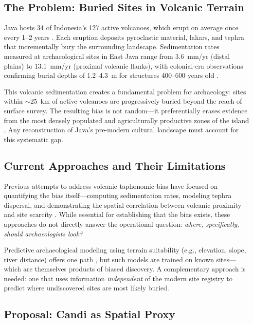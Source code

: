 \documentclass[12pt,a4paper]{article}
\begin{document}
\subsection{The Problem: Buried Sites in Volcanic Terrain}

Java hosts 34 of Indonesia's 127 active volcanoes, which erupt on average once every 1--2 years \citep{gvp2023}. Each eruption deposits pyroclastic material, lahars, and tephra that incrementally bury the surrounding landscape. Sedimentation rates measured at archaeological sites in East Java range from 3.6~mm/yr (distal plains) to 13.1~mm/yr (proximal volcanic flanks), with colonial-era observations confirming burial depths of 1.2--4.3~m for structures 400--600 years old \citep{amien2026p1}.

This volcanic sedimentation creates a fundamental problem for archaeology: sites within $\sim$25~km of active volcanoes are progressively buried beyond the reach of surface survey. The resulting bias is not random---it preferentially erases evidence from the most densely populated and agriculturally productive zones of the island \citep{mohr1938}. Any reconstruction of Java's pre-modern cultural landscape must account for this systematic gap.

\subsection{Current Approaches and Their Limitations}

Previous attempts to address volcanic taphonomic bias have focused on quantifying the bias itself---computing sedimentation rates, modeling tephra dispersal, and demonstrating the spatial correlation between volcanic proximity and site scarcity \citep{amien2026p1, amien2026p2}. While essential for establishing that the bias exists, these approaches do not directly answer the operational question: \emph{where, specifically, should archaeologists look?}

Predictive archaeological modeling using terrain suitability (e.g., elevation, slope, river distance) offers one path \citep{amien2026p2}, but such models are trained on known sites---which are themselves products of biased discovery. A complementary approach is needed: one that uses information \emph{independent} of the modern site registry to predict where undiscovered sites are most likely buried.

\subsection{Proposal: Candi as Spatial Proxy}
\end{document}
